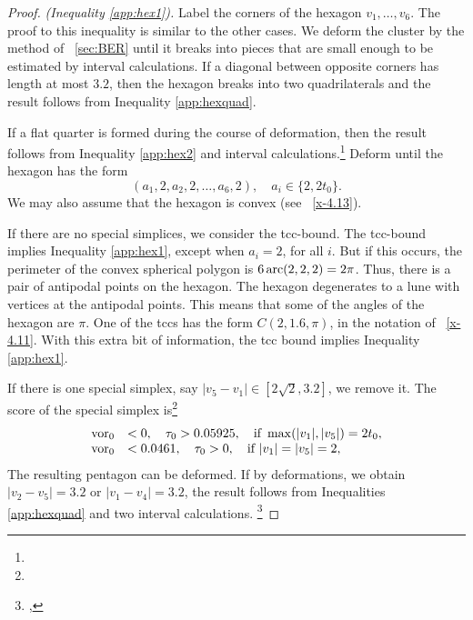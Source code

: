 \smallskip
\begin{proof}
{\it (Inequality \ref{app:hex1}).} Label the corners of the hexagon
$v_1,\ldots,v_6$.  The proof to this inequality is similar to the
other cases.  We deform the cluster by the method of
\Chap~\ref{sec:BER} until it breaks into pieces that are small
enough to be estimated by interval calculations. If a diagonal
between opposite corners has length at most $3.2$, then the hexagon
breaks into two quadrilaterals and the result follows from
Inequality \ref{app:hexquad}.

If a flat quarter is formed during the course of deformation, then
the result follows from Inequality \ref{app:hex2} and interval
calculations.\footnote{} %
Deform until the hexagon
has the form
    $$(a_1,2,a_2,2,\ldots,a_6,2),\quad a_i\in\{2,2t_0\}.$$
We may also assume that the hexagon is convex (see
\Chap~\ref{x-4.13}). %

If there are no special simplices, we consider the tcc-bound. The
tcc-bound implies Inequality \ref {app:hex1}, except when $a_i=2$,
for all $i$. But if this occurs, the perimeter of the convex
spherical polygon is $6\operatorname{arc}(2,2,2)=2\pi$.  Thus, there is a pair
of antipodal points on the hexagon.  The hexagon degenerates to a
lune with vertices at the antipodal points.  This means that some
of the angles of the hexagon are $\pi$.   One of the tccs has the
form $C(2,1.6,\pi)$, in the notation of \Chap~\ref{x-4.11}.
With this extra bit of information, the
tcc bound implies Inequality \ref {app:hex1}.

If there is one special simplex, say $|v_5-v_1|\in[2\sqrt2,3.2]$,
we remove it. The score of the special simplex is\footnote{} %
    $$
    \begin{array}{lll}
    \operatorname{vor}_0 &< 0,\quad \tau_0>0.05925,\quad\text{if }\max(|v_1|,|v_5|)=2t_0,\\
    \operatorname{vor}_0 &< 0.0461,\quad \tau_0>0,\quad\text{if }|v_1|=|v_5|=2,\\
    \end{array}
    $$
The resulting pentagon can be deformed. If by deformations, we
obtain $|v_2-v_5|=3.2$ or $|v_1-v_4|=3.2$, the result follows from
Inequalities \ref{app:hexquad} and two interval calculations.%
\footnote{, }




\end{proof}

